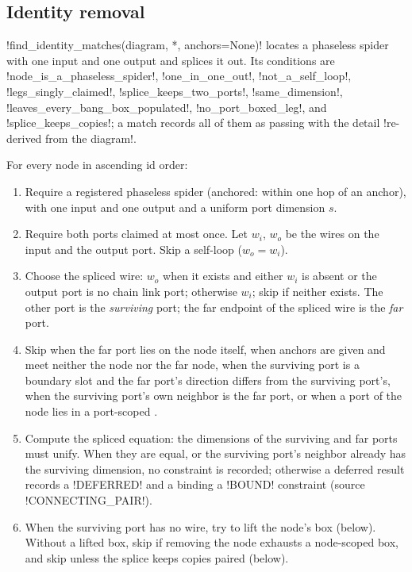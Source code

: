 \subsection{Identity removal}\label{sec:rewriting-identity}

\py!find_identity_matches(diagram, *, anchors=None)! locates a phaseless spider with one input and
one output and splices it out. Its conditions are \code!node_is_a_phaseless_spider!,
\code!one_in_one_out!, \code!not_a_self_loop!, \code!legs_singly_claimed!,
\code!splice_keeps_two_ports!, \code!same_dimension!, \code!leaves_every_bang_box_populated!,
\code!no_port_boxed_leg!, and \code!splice_keeps_copies!; a match records all of them as passing
with the detail \code!re-derived from the diagram!.

\begin{algorithm}\label{alg:rewriting-identity}
For every node in ascending id order:
\begin{enumerate}
\item Require a registered phaseless spider (anchored: within one hop of an anchor), with one
  input and one output and a uniform port dimension $s$.
\item Require both ports claimed at most once. Let $w_i$, $w_o$ be the wires on the input and the
  output port. Skip a self-loop ($w_o = w_i$).
\item Choose the spliced wire: $w_o$ when it exists and either $w_i$ is absent or the output port
  is no chain link port; otherwise $w_i$; skip if neither exists. The other port is the
  \emph{surviving} port; the far endpoint of the spliced wire is the \emph{far} port.
\item Skip when the far port lies on the node itself, when anchors are given and meet neither the
  node nor the far node, when the surviving port is a boundary slot and the far port's direction
  differs from the surviving port's, when the surviving port's own neighbor is the far port, or
  when a port of the node lies in a port-scoped \bbox{}.
\item Compute the spliced equation: the dimensions of the surviving and far ports must unify. When
  they are equal, or the surviving port's neighbor already has the surviving dimension, no
  constraint is recorded; otherwise a deferred result records a \code!DEFERRED! and a binding a
  \code!BOUND! constraint (source \code!CONNECTING_PAIR!).
\item When the surviving port has no wire, try to lift the node's box (below). Without a lifted
  box, skip if removing the node exhausts a node-scoped box, and skip unless the splice keeps
  copies paired (below).
\end{enumerate}
\end{algorithm}

